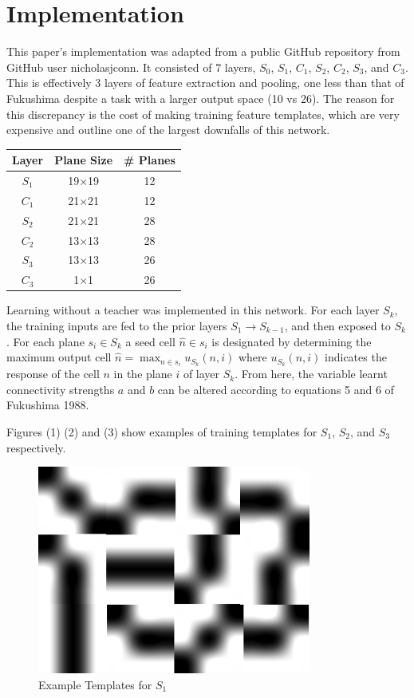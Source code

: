 \documentclass[12pt]{article}
\begin{document}
\section{Implementation}
This paper's implementation was adapted from a public GitHub repository from GitHub user nicholasjconn. It consisted of 7 layers, $S_0$, $S_1$, $C_1$, $S_2$, $C_2$, $S_3$, and $C_3$. This is effectively 3 layers of feature extraction and pooling, one less than that of Fukushima despite a task with a larger output space (10 vs 26). The reason for this discrepancy is the cost of making training feature templates, which are very expensive and outline one of the largest downfalls of this network. 
\begin{center}
  \begin{tabular}{| c | c | c |}
  \hline 
  Layer & Plane Size & \# Planes \\ \hline
  $S_1$ & 19$\times$19 & 12 \\ \hline
  $C_1$ & 21$\times$21 & 12 \\ \hline
  $S_2$ & 21$\times$21 & 28 \\ \hline
  $C_2$ & 13$\times$13 & 28 \\ \hline
  $S_3$ & 13$\times$13 & 26 \\ \hline
  $C_3$ & 1$\times$1 & 26 \\
  \hline
  \end{tabular}
\end{center}

Learning without a teacher was implemented in this network. For each layer $S_k$, the training inputs are fed to the prior layers $S_1 \to S_{k-1}$, and then exposed to $S_k$. For each plane $s_i \in S_k$ a seed cell $\hat{n} \in s_i$ is designated by determining the maximum output cell $\hat{n} = \max_{n \in s_i} u_{S_k}(n, i)$ where $u_{S_k}(n, i)$ indicates the response of the cell $n$ in the plane $i$ of layer $S_k$. From here, the variable learnt connectivity strengths $a$ and $b$ can be altered according to equations 5 and 6 of Fukushima 1988. 

Figures (1) (2) and (3) show examples of training templates for $S_1$, $S_2$, and $S_3$ respectively. 

\begin{figure}[ht!]
\centering
\includegraphics[width=90mm]{firstLayer.png}
\caption{Example Templates for $S_1$}
\end{figure}
\end{document}
